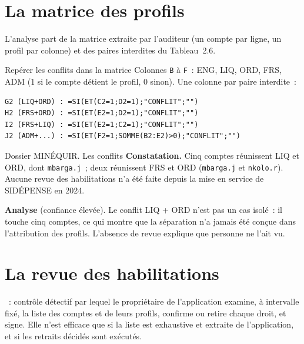 \separateur

\section{La matrice des profils}
\label{sec:c09-matrice}

L'analyse part de la matrice extraite par l'auditeur (un compte par ligne,
un profil par colonne) et des paires interdites du Tableau~2.6.

\begin{boxoutils}{Repérer les conflits dans la matrice}
Colonnes \texttt{B} à \texttt{F}~: ENG, LIQ, ORD, FRS, ADM (1 si le
compte détient le profil, 0 sinon). Une colonne par paire interdite~:
\begin{lstlisting}
G2 (LIQ+ORD) : =SI(ET(C2=1;D2=1);"CONFLIT";"")
H2 (FRS+ORD) : =SI(ET(E2=1;D2=1);"CONFLIT";"")
I2 (FRS+LIQ) : =SI(ET(E2=1;C2=1);"CONFLIT";"")
J2 (ADM+...) : =SI(ET(F2=1;SOMME(B2:E2)>0);"CONFLIT";"")
\end{lstlisting}
\end{boxoutils}

\begin{boxscenario}{Dossier MINÉQUIR. Les conflits}
\textbf{Constatation.} Cinq comptes réunissent LIQ et ORD, dont
\texttt{mbarga.j}~; deux réunissent FRS et ORD (\texttt{mbarga.j} et
\texttt{nkolo.r}). Aucune revue des habilitations n'a été faite depuis la
mise en service de SIDÉPENSE en 2024.

\medskip
\textbf{Analyse} (confiance élevée). Le conflit LIQ + ORD n'est pas un
cas isolé~: il touche cinq comptes, ce qui montre que la séparation n'a
jamais été conçue dans l'attribution des profils. L'absence de revue
explique que personne ne l'ait vu.
\end{boxscenario}

\separateur

\section{La revue des habilitations}
\label{sec:c09-revue}

\begin{boxdef}
~:
contrôle détectif par lequel le propriétaire de l'application examine,
à intervalle fixé, la liste des comptes et de leurs profils, confirme ou
retire chaque droit, et signe. Elle n'est efficace que si la liste est
exhaustive et extraite de l'application, et si les retraits décidés sont
exécutés.
\end{boxdef}

